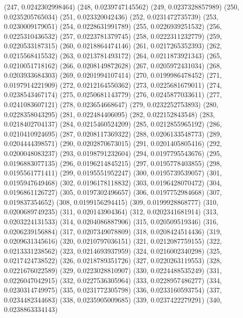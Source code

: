 {					(247, 0.0242302998464)
					(248, 0.0239747145562)
					(249, 0.0237328857989)
					(250, 0.0235205765034)
					(251, 0.023320042436)
					(252, 0.0231472735739)
					(253, 0.0230009179051)
					(254, 0.0228631991789)
					(255, 0.0226939251532)
					(256, 0.0225310436532)
					(257, 0.0223781379745)
					(258, 0.0222311232779)
					(259, 0.0220533187315)
					(260, 0.0218864474146)
					(261, 0.0217265352393)
					(262, 0.0215568415532)
					(263, 0.0213781493172)
					(264, 0.0211873921343)
					(265, 0.0210051718162)
					(266, 0.0208149872628)
					(267, 0.0205972431034)
					(268, 0.0203933684303)
					(269, 0.0201994107414)
					(270, 0.0199986478452)
					(271, 0.0197914221909)
					(272, 0.0212164550362)
					(273, 0.0225681679011)
					(274, 0.0238543467174)
					(275, 0.0250681143779)
					(276, 0.0245877033611)
					(277, 0.0241083607121)
					(278, 0.023654668647)
					(279, 0.0232252753893)
					(280, 0.0228358043295)
					(281, 0.022484406095)
					(282, 0.022152843548)
					(283, 0.0218402704137)
					(284, 0.0215460524209)
					(285, 0.0212855965192)
					(286, 0.0210410924695)
					(287, 0.0208117369322)
					(288, 0.0206133548773)
					(289, 0.0204444398571)
					(290, 0.0202870673015)
					(291, 0.0201405805416)
					(292, 0.0200048083237)
					(293, 0.0198791232604)
					(294, 0.0197795543676)
					(295, 0.0196883077135)
					(296, 0.0196214845215)
					(297, 0.0195778403855)
					(298, 0.0195561771411)
					(299, 0.0195551952247)
					(300, 0.0195739539057)
					(301, 0.0195947649468)
					(302, 0.0196178118832)
					(303, 0.0196428070472)
					(304, 0.0196861126727)
					(305, 0.0197302496657)
					(306, 0.0197752984668)
					(307, 0.019837354652)
					(308, 0.0199156294415)
					(309, 0.0199928868777)
					(310, 0.0200689749235)
					(311, 0.020143904364)
					(312, 0.0202341681914)
					(313, 0.0203224131533)
					(314, 0.0204086887906)
					(315, 0.020509519346)
					(316, 0.0206239156884)
					(317, 0.0207349078809)
					(318, 0.0208424514436)
					(319, 0.0209631345616)
					(320, 0.0210797036151)
					(321, 0.0212087759155)
					(322, 0.0213331238562)
					(323, 0.0214693937959)
					(324, 0.0216002340298)
					(325, 0.0217424738522)
					(326, 0.0218789351726)
					(327, 0.0220263119553)
					(328, 0.0221676022589)
					(329, 0.0223028810907)
					(330, 0.0224488535249)
					(331, 0.0226047042915)
					(332, 0.0227536305964)
					(333, 0.0228957486277)
					(334, 0.0230314749975)
					(335, 0.0231772305798)
					(336, 0.0233160593754)
					(337, 0.0234482344683)
					(338, 0.0235905009685)
					(339, 0.0237422279291)
					(340, 0.0238863334143)
}
